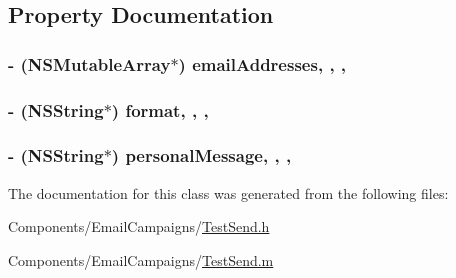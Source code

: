 \subsection{Property Documentation}
\hypertarget{interface_test_send_ae3149637744140d9ce2eadea8d3acd80}{
\subsubsection[{email\-Addresses}]{\setlength{\rightskip}{0pt plus 5cm}-\/ (N\-S\-Mutable\-Array$\ast$) email\-Addresses\hspace{0.3cm}{\ttfamily [read]}, {\ttfamily [write]}, {\ttfamily [nonatomic]}, {\ttfamily [strong]}}}\label{interface_test_send_ae3149637744140d9ce2eadea8d3acd80}
\hypertarget{interface_test_send_a9b8f331d88f602bfb6281faaaa1640f0}{
\subsubsection[{format}]{\setlength{\rightskip}{0pt plus 5cm}-\/ (N\-S\-String$\ast$) format\hspace{0.3cm}{\ttfamily [read]}, {\ttfamily [write]}, {\ttfamily [nonatomic]}, {\ttfamily [strong]}}}\label{interface_test_send_a9b8f331d88f602bfb6281faaaa1640f0}
\hypertarget{interface_test_send_ae45669f79ceeb6e5b3ec4c47fa7471fc}{
\subsubsection[{personal\-Message}]{\setlength{\rightskip}{0pt plus 5cm}-\/ (N\-S\-String$\ast$) personal\-Message\hspace{0.3cm}{\ttfamily [read]}, {\ttfamily [write]}, {\ttfamily [nonatomic]}, {\ttfamily [strong]}}}\label{interface_test_send_ae45669f79ceeb6e5b3ec4c47fa7471fc}


The documentation for this class was generated from the following files\-:\begin{DoxyCompactItemize}
\item 
Components/\-Email\-Campaigns/\hyperlink{_test_send_8h}{Test\-Send.\-h}\item 
Components/\-Email\-Campaigns/\hyperlink{_test_send_8m}{Test\-Send.\-m}\end{DoxyCompactItemize}
